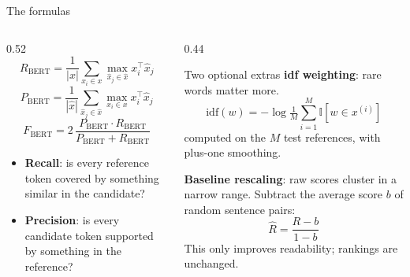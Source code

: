 \documentclass[aspectratio=169,11pt]{beamer}
\begin{document}
\begin{frame}{The formulas}
  \begin{columns}[T]
    \begin{column}{0.52\textwidth}
      \small
      \[
        R_{\text{BERT}}=\frac{1}{|x|}\sum_{x_i\in x}\max_{\hat x_j\in\hat x}x_i^\top\hat x_j
      \]
      \[
        P_{\text{BERT}}=\frac{1}{|\hat x|}\sum_{\hat x_j\in\hat x}\max_{x_i\in x}x_i^\top\hat x_j
      \]
      \[
        F_{\text{BERT}}=2\,\frac{P_{\text{BERT}}\cdot R_{\text{BERT}}}{P_{\text{BERT}}+R_{\text{BERT}}}
      \]
      \begin{itemize}
        \item \textbf{Recall}: is every reference token covered by something similar in the candidate?
        \item \textbf{Precision}: is every candidate token supported by something in the reference?
      \end{itemize}
    \end{column}
    \begin{column}{0.44\textwidth}
      \begin{block}{Two optional extras}
        \small
        \textbf{idf weighting}: rare words matter more.
        \[
          \text{idf}(w)=-\log\tfrac1M\textstyle\sum_{i=1}^{M}\mathbb{I}[w\in x^{(i)}]
        \]
        computed on the $M$ test references, with plus-one smoothing.
        \vspace{1mm}

        \textbf{Baseline rescaling}: raw scores cluster in a narrow range. Subtract the average score $b$ of random sentence pairs:
        \[
          \hat R=\frac{R-b}{1-b}
        \]
        This only improves readability; rankings are unchanged.
      \end{block}
    \end{column}
  \end{columns}
\end{frame}
\end{document}
